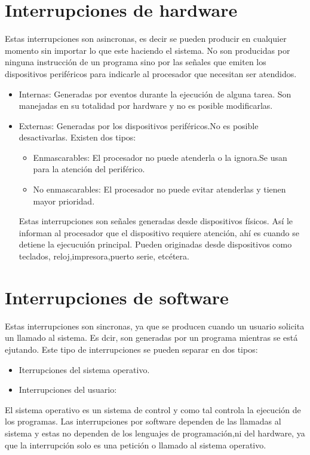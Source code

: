 \documentclass{report}   %
\begin{document}
\section*{Interrupciones de hardware}
Estas interrupciones son asincronas, es decir se pueden producir en cualquier momento sin importar lo que este haciendo el sistema. No son producidas por ninguna instrucción de un programa sino por las señales que emiten los dispositivos periféricos para indicarle al procesador que necesitan ser atendidos.

\begin{itemize}
    \item Internas: Generadas por eventos durante la ejecución de alguna tarea. Son manejadas en su totalidad por hardware y no es posible modificarlas.
    \item Externas: Generadas por los dispositivos periféricos.No es posible desactivarlas. Existen dos tipos:
      \begin{itemize}
        \item{Enmascarables:}
        El procesador no puede atenderla o la ignora.Se usan para la atención del periférico.
        \item{No enmascarables:}
        El procesador no puede evitar atenderlas y tienen mayor prioridad.
  \end{itemize}
  
  Estas interrupciones son señales generadas desde dispositivos físicos. Así le informan al procesador que el dispositivo requiere atención, ahí es cuando se detiene la ejecucuión principal. Pueden originadas desde dispositivos como teclados, reloj,impresora,puerto serie, etcétera.
\end{itemize}
\section*{Interrupciones de software}
Estas interrupciones son sincronas, ya que se producen cuando un usuario solicita un llamado al sistema. Es dcir, son generadas por un programa mientras se está ejutando. Este tipo de interrupciones se pueden separar en dos tipos:
\begin{itemize}
        \item{Iterrupciones del sistema operativo.}
        \item{Interrupciones del usuario:} 
  \end{itemize}
  
El sistema operativo es un sistema de control y como tal controla la ejecución de los programas. Las interrupciones por software dependen de las llamadas al sistema y estas no dependen de los lenguajes de programación,ni del hardware, ya que la interrupción solo es una petición o llamado al sistema operativo.
\end{document}
